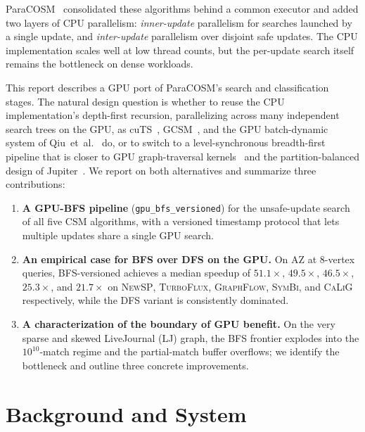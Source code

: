 \documentclass[sigconf,nonacm]{acmart}
\theoremstyle{definition}
\begin{document}
ParaCOSM~\cite{paracosm2025} consolidated these algorithms behind a common executor and added two layers of CPU parallelism: \emph{inner-update} parallelism for searches launched by a single update, and \emph{inter-update} parallelism over disjoint safe updates. The CPU implementation scales well at low thread counts, but the per-update search itself remains the bottleneck on dense workloads.

This report describes a GPU port of ParaCOSM's search and classification stages. The natural design question is whether to reuse the CPU implementation's depth-first recursion, parallelizing across many independent search trees on the GPU, as cuTS~\cite{xiang2021cuts}, GCSM~\cite{wei2024gcsm}, and the GPU batch-dynamic system of Qiu~et~al.~\cite{qiu2024gpubatch} do, or to switch to a level-synchronous breadth-first pipeline that is closer to GPU graph-traversal kernels~\cite{merrill2015hpcgraph} and the partition-balanced design of Jupiter~\cite{lin2025jupiter}. We report on both alternatives and summarize three contributions:

\begin{enumerate}
    \item \textbf{A GPU-BFS pipeline} (\texttt{gpu\_bfs\_versioned}) for the unsafe-update search of all five CSM algorithms, with a versioned timestamp protocol that lets multiple updates share a single GPU search.
    \item \textbf{An empirical case for BFS over DFS on the GPU.} On AZ at 8-vertex queries, BFS-versioned achieves a median speedup of $51.1\times$, $49.5\times$, $46.5\times$, $25.3\times$, and $21.7\times$ on \textsc{NewSP}, \textsc{TurboFlux}, \textsc{GraphFlow}, \textsc{SymBi}, and \textsc{CaLiG} respectively, while the DFS variant is consistently dominated.
    \item \textbf{A characterization of the boundary of GPU benefit.} On the very sparse and skewed LiveJournal (LJ) graph, the BFS frontier explodes into the $10^{10}$-match regime and the partial-match buffer overflows; we identify the bottleneck and outline three concrete improvements.
\end{enumerate}

\section{Background and System}
\end{document}
